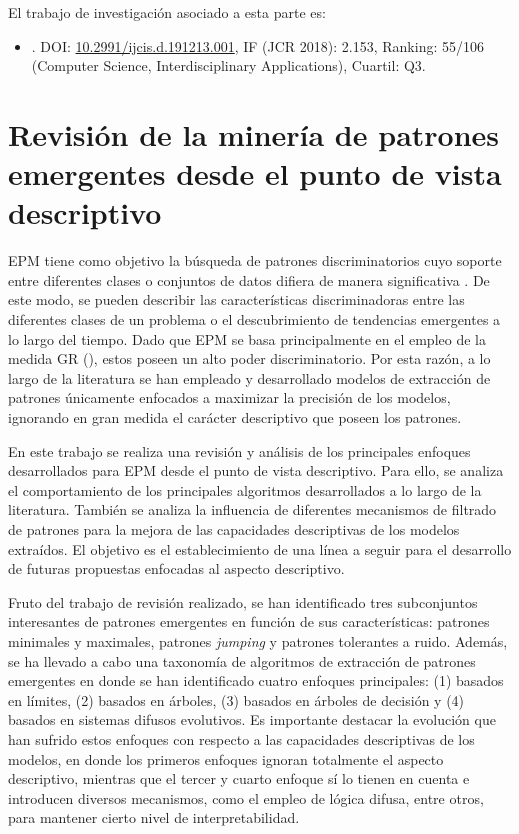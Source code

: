 \documentclass[c5paper,10pt,twoside]{book}	   	%
\newcommand{\doi}[1]{\href{https://doi.org/#1}{#1}}
\begin{document}
El trabajo de investigación asociado a esta parte es:

\begin{itemize}
	\item {}. DOI: \doi{10.2991/ijcis.d.191213.001}, IF (JCR 2018): 2.153, Ranking: 55/106 (Computer Science, Interdisciplinary Applications), Cuartil: Q3.
\end{itemize}


\section{Revisión de la minería de patrones emergentes desde el punto de vista descriptivo} \label{sec:reviewEPM}

\ac{EPM} tiene como objetivo la búsqueda de patrones discriminatorios cuyo soporte entre diferentes clases o conjuntos de datos difiera de manera significativa \cite{Dl99}. De este modo, se pueden describir las características discriminadoras entre las diferentes clases de un problema o el descubrimiento de tendencias emergentes a lo largo del tiempo. Dado que \ac{EPM} se basa principalmente en el empleo de la medida \ac{GR} (), estos poseen un alto poder discriminatorio. Por esta razón, a lo largo de la literatura se han empleado y desarrollado modelos de extracción de patrones únicamente enfocados a maximizar la precisión de los modelos, ignorando en gran medida el carácter descriptivo que poseen los patrones.

En este trabajo se realiza una revisión y análisis de los principales enfoques desarrollados para \ac{EPM} desde el punto de vista descriptivo. Para ello, se analiza el comportamiento de los principales algoritmos desarrollados a lo largo de la literatura. También se analiza la influencia de diferentes mecanismos de filtrado de patrones para la mejora de las capacidades descriptivas de los modelos extraídos. El objetivo es el establecimiento de una línea a seguir para el desarrollo de futuras propuestas enfocadas al aspecto descriptivo.

Fruto del trabajo de revisión realizado, se han identificado tres subconjuntos interesantes de patrones emergentes en función de sus características: patrones minimales y maximales, patrones \textit{jumping} y patrones tolerantes a ruido. Además, se ha llevado a cabo una taxonomía de algoritmos de extracción de patrones emergentes en donde se han identificado cuatro enfoques principales: (1) basados en límites, (2) basados en árboles, (3) basados en árboles de decisión y (4) basados en sistemas difusos evolutivos. Es importante destacar la evolución que han sufrido estos enfoques con respecto a las capacidades descriptivas de los modelos, en donde los primeros enfoques ignoran totalmente el aspecto descriptivo, mientras que el tercer y cuarto enfoque sí lo tienen en cuenta e introducen diversos mecanismos, como el empleo de lógica difusa, entre otros, para mantener cierto nivel de interpretabilidad.
\end{document}

